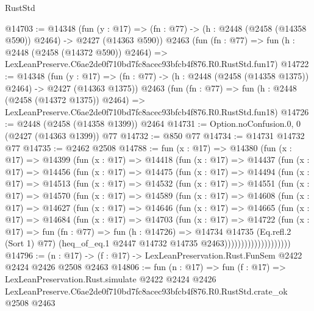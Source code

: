 \begin{lexlean}{RustStd}
\begin{coremodule}
@14703 := @14348
    (fun (y : @17) => (fn : @77) -> (h : @2448 (@2458 (@14358 @590)) @2464) -> @2427 (@14363 @590))
    @2463
    (fun (fn : @77) =>
    fun (h : @2448 (@2458 (@14372 @590)) @2464) =>
    LexLeanPreserve.C6ae2de0f710bd7fc8acec93bfcb4f876.R0.RustStd.fun17)
@14722 := @14348
    (fun (y : @17) =>
    (fn : @77) -> (h : @2448 (@2458 (@14358 @1375)) @2464) -> @2427 (@14363 @1375))
    @2463
    (fun (fn : @77) =>
    fun (h : @2448 (@2458 (@14372 @1375)) @2464) =>
    LexLeanPreserve.C6ae2de0f710bd7fc8acec93bfcb4f876.R0.RustStd.fun18)
@14726 := @2448 (@2458 (@14358 @1399)) @2464
@14731 := Option.noConfusion.{0, 0} (@2427 (@14363 @1399)) @77
@14732 := @850 @77
@14734 := @14731 @14732 @77
@14735 := @2462 @2508
@14788 := fun (x : @17) =>
  @14380
    (fun (x : @17) =>
    @14399
      (fun (x : @17) =>
      @14418
        (fun (x : @17) =>
        @14437
          (fun (x : @17) =>
          @14456
            (fun (x : @17) =>
            @14475
              (fun (x : @17) =>
              @14494
                (fun (x : @17) =>
                @14513
                  (fun (x : @17) =>
                  @14532
                    (fun (x : @17) =>
                    @14551
                      (fun (x : @17) =>
                      @14570
                        (fun (x : @17) =>
                        @14589
                          (fun (x : @17) =>
                          @14608
                            (fun (x : @17) =>
                            @14627
                              (fun (x : @17) =>
                              @14646
                                (fun (x : @17) =>
                                @14665
                                  (fun (x : @17) =>
                                  @14684
                                    (fun (x : @17) =>
                                    @14703
                                      (fun (x : @17) =>
                                      @14722
                                        (fun (x : @17) =>
                                        fun (fn : @77) =>
                                        fun (h : @14726) =>
                                        @14734
                                          @14735
                                          (Eq.refl.{2} (Sort 1) @77)
                                          (heq_of_eq.{1}
                                            @2447
                                            @14732
                                            @14735
                                            @2463))))))))))))))))))))
@14796 := (n : @17) -> (f : @17) -> LexLeanPreservation.Rust.FunSem @2422 @2424 @2426 @2508 @2463
@14806 := fun (n : @17) =>
  fun (f : @17) =>
  LexLeanPreservation.Rust.simulate
    @2422
    @2424
    @2426
    LexLeanPreserve.C6ae2de0f710bd7fc8acec93bfcb4f876.R0.RustStd.crate_ok
    @2508
    @2463
\end{coremodule}
\end{lexlean}
